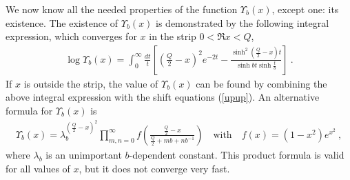 \documentclass[12pt,a4paper,notitlepage]{report}
\numberwithin{equation}{section}
\theoremstyle{break}
\begin{document}
We now know all the needed properties of the function $\Upsilon_b(x)$, except one: its existence. The existence of $\Upsilon_b(x)$ is demonstrated by the following integral expression, which converges for $x$ in the strip $0<\Re x<Q$, 
\begin{align}
 \log\Upsilon_b(x) = \int_0^\infty \frac{dt}{t} \left[\left(\tfrac{Q}{2}-x\right)^2 e^{-2t} -\frac{\sinh^2\left(\frac{Q}{2}-x\right)t}{\sinh bt\sinh\frac{t}{b}}\right]\ .
\label{lup}
\end{align}
If $x$ is outside the strip, the value of $\Upsilon_b(x)$ can be found by combining the above integral expression with the shift equations (\ref{upup}). An alternative formula for $\Upsilon_b(x)$ is 
\begin{align}
 \Upsilon_b(x) = \lambda_b^{(\frac{Q}{2}-x)^2}\prod_{m,n=0}^\infty f\left(\frac{\frac{Q}{2}-x}{\frac{Q}{2}+mb+nb^{-1}}\right) \quad \text{with} \quad f(x)=(1-x^2)e^{x^2}\ ,
\end{align}
where $\lambda_b$ is an unimportant $b$-dependent constant. This product formula is valid for all values of $x$, but it does not converge very fast.
\end{document}
